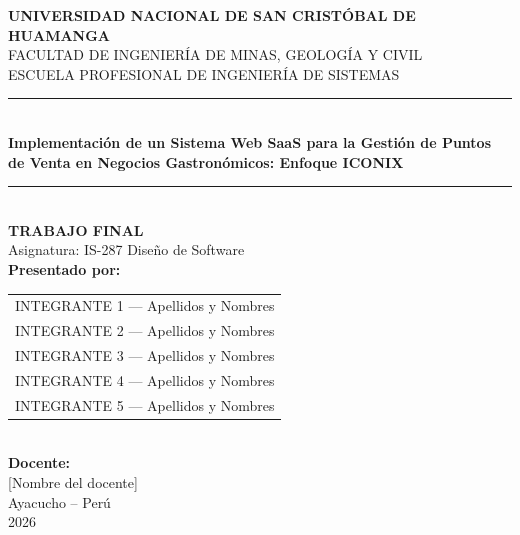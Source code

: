 \documentclass[12pt, a4paper]{article}
\begin{document}
\begin{titlepage}
    \begin{center}

        \vspace*{0.5cm}


        \vspace{0.8cm}

        {\large \textbf{UNIVERSIDAD NACIONAL DE SAN CRISTÓBAL DE HUAMANGA}}\\[0.3cm]
        {\normalsize FACULTAD DE INGENIERÍA DE MINAS, GEOLOGÍA Y CIVIL}\\[0.2cm]
        {\normalsize ESCUELA PROFESIONAL DE INGENIERÍA DE SISTEMAS}\\[1.5cm]

        \rule{12cm}{0.5pt}\\[0.4cm]
        {\LARGE \textbf{Implementación de un Sistema Web SaaS para la Gestión de Puntos de Venta en Negocios Gastronómicos: Enfoque ICONIX}}\\[0.3cm]
        \rule{12cm}{0.5pt}\\[1.5cm]

        {\large \textbf{TRABAJO FINAL}}\\[0.3cm]
        {\normalsize Asignatura: IS-287 Diseño de Software}\\[1.5cm]

        {\normalsize \textbf{Presentado por:}}\\[0.3cm]
        \begin{tabular}{l}
            INTEGRANTE 1 — Apellidos y Nombres \\
            INTEGRANTE 2 — Apellidos y Nombres \\
            INTEGRANTE 3 — Apellidos y Nombres \\
            INTEGRANTE 4 — Apellidos y Nombres \\
            INTEGRANTE 5 — Apellidos y Nombres \\
        \end{tabular}\\[1.5cm]

        {\normalsize \textbf{Docente:}}\\[0.2cm]
        {\normalsize [Nombre del docente]}\\[1.5cm]

        {\normalsize Ayacucho -- Perú}\\[0.2cm]
        {\normalsize 2026}

    \end{center}
\end{titlepage}
\end{document}
